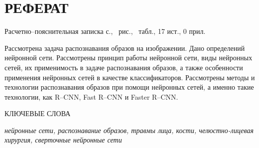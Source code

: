 \section*{РЕФЕРАТ}

Расчетно--пояснительная записка \pageref{LastPage} с., \totalfigures\ рис., \totaltables\ табл., 17 ист., 0 прил.

Рассмотрена задача распознавания образов на изображении. Дано определений нейронной сети. Рассмотрены принцип работы нейронной сети, виды нейронных сетей, их применимость в задаче распознавания образов, а также особенности применения нейронных сетей в качестве классификаторов. Рассмотрены методы и технологии распознавания образов при помощи нейронных сетей, а именно такие технологии, как R--CNN, Fast R--CNN и Faster R--CNN.

КЛЮЧЕВЫЕ СЛОВА

\textit{нейронные сети, распознавание образов, травмы лица, кости, челюстно-лицевая хирургия, сверточные нейронные сети}